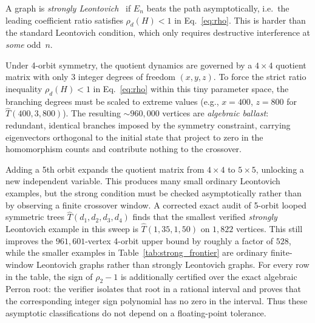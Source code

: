 \begin{remark}
\label{rem:ballast}
A graph is \emph{strongly Leontovich}~\cite{galvin2026} if
$E_n$ beats the path asymptotically, i.e.\ the leading coefficient ratio
satisfies $\rho_d(H) < 1$ in Eq.~\eqref{eq:rho}.  This is harder than
the standard Leontovich condition, which only requires destructive
interference at \emph{some} odd~$n$.

Under 4-orbit symmetry, the quotient dynamics are governed by a
$4 \times 4$ quotient matrix with only 3 integer degrees of freedom
$(x, y, z)$.  To force the strict ratio inequality $\rho_d(H) < 1$ in
Eq.~\eqref{eq:rho} within this tiny parameter space, the branching degrees
must be scaled to extreme values (e.g., $x = 400$, $z = 800$ for
$\hat{T}(400, 3, 800)$).  The resulting $\sim\!960{,}000$ vertices are
\emph{algebraic ballast}: redundant, identical branches imposed by the
symmetry constraint, carrying eigenvectors orthogonal to the initial state
that project to zero in the homomorphism counts and contribute nothing to
the crossover.

Adding a 5th orbit expands the quotient matrix from $4 \times 4$ to
$5 \times 5$, unlocking a new independent variable.  This produces many
small ordinary Leontovich examples, but the strong condition must be checked
asymptotically rather than by observing a finite crossover window.  A corrected
exact audit of 5-orbit looped symmetric trees
$\hat{T}(d_1, d_2, d_3, d_4)$ finds that the smallest verified
\textit{strongly} Leontovich example in this sweep is
$\hat{T}(1, 35, 1, 50)$ on $1{,}822$ vertices.  This still improves the
$961{,}601$-vertex 4-orbit upper bound by roughly a factor of $528$, while the
smaller examples in Table~\ref{tab:strong_frontier} are ordinary finite-window
Leontovich graphs rather than strongly Leontovich graphs.
For every row in the table, the sign of $\rho_2-1$ is additionally certified
over the exact algebraic Perron root: the verifier isolates that root in a
rational interval and proves that the corresponding integer sign polynomial
has no zero in the interval. Thus these asymptotic classifications do not
depend on a floating-point tolerance.


\end{remark}
